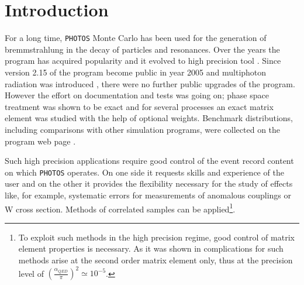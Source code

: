 \documentclass[]{Photos_interface_design}
\begin{document}
\maketitle

\tableofcontents{}

\newpage

\section{Introduction}
For a long time, {\tt PHOTOS} Monte Carlo \cite{Barberio:1990ms,Barberio:1993qi} 
has been used for the generation of bremmstrahlung in the decay of particles and resonances.
Over the years the program has acquired
popularity and it evolved to high 
precision tool \cite{Golonka:2006tw}. Since version 2.15 of the program become 
public in year 2005 and multiphoton radiation was 
introduced \cite{Golonka:2005pn}, there were no further public upgrades 
of the program. However the effort on documentation and tests was going on;
 phase space treatment was shown to be 
exact \cite{Nanava:2006vv} and for several 
processes \cite{Golonka:2006tw,Nanava:2006vv,Nanava:2009vg}
an exact matrix element was studied with the help of optional weights.
Benchmark distributions, including comparisons with  
other simulation programs, were collected on the program web page \cite{Photos_tests}. 

 Such high precision applications require good control of the event record content on which {\tt PHOTOS} operates. On one side it 
requests skills and experience of the user and on the other it provides 
the flexibility necessary for the study of effects like, for example, systematic errors for 
measurements of anomalous couplings or W cross section. Methods of 
correlated samples  can be applied\footnote{To exploit such methods in 
the high precision regime, good control of matrix element properties is necessary.
As it was shown in \cite{Kleiss:1990jv} complications for such methods arise at the second order matrix element only, thus at the precision level of 
$(\frac{\alpha_{QED}}{\pi})^2 \simeq 10^{-5}$.}. 
\end{document}
